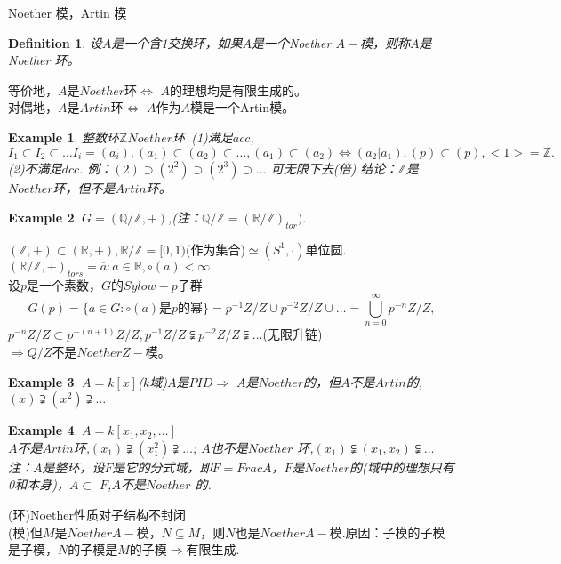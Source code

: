 \documentclass[UTF8]{article}
\newtheorem{defn}{Definition}[section]
\newtheorem{exa}{Example}[section]
\begin{document}
Noether 模，Artin 模\\
\begin{defn}
	设$A$是一个含1交换环，如果$A$是一个Noether $A-$模，则称$A$是Noether 环。
\end{defn}
等价地，$A$是$Noether$环$\Leftrightarrow$ $A$的理想均是有限生成的。\\
对偶地，$A$是$Artin$环$\Leftrightarrow$ $A$作为$A$模是一个Artin模。
\begin{exa}
整数环$\mathbb{Z}Noether$环\
(1)满足$acc$,$I_1\subset I_2\subset\ldots I_i=(a_i),
(a_1)\subset(a_2)\subset\ldots,(a_1)\subset(a_2)\Leftrightarrow(a_2|a_1),(p)\subset(p),<1>=\mathbb{Z}.$\\
(2)不满足$dcc$.
例：$(2)\supset(2^2)\supset(2^3)\supset\ldots$ 可无限下去(倍)
结论：$\mathbb{Z}$是$Noether$环，但不是$Artin$环。
\end{exa}
\begin{exa}
$G=(\mathbb{Q}/\mathbb{Z},+)$,(注：$\mathbb{Q}/\mathbb{Z}=(\mathbb{R}/\mathbb{Z})_{tor}).$
\end{exa}
$(\mathbb{Z},+)\subset(\mathbb{R},+),\mathbb{R}/\mathbb{Z}=[0,1)$(作为集合)$\simeq(S^1,\cdot)$单位圆.\\
$(\mathbb{R}/\mathbb{Z},+)_{tors}={\overline{a}:a\in \mathbb{R},\circ(a)<\infty}.$\\
设$p$是一个素数，$G$的$Sylow-p$子群
$$G(p)=\{a\in G:\circ(a)\text{是}p\text{的幂}\}=p^{-1}Z/Z\cup p^{-2}Z/Z\cup\ldots
=\bigcup\limits_{n=0}^\infty{p^{-n}Z/Z},
$$
$p^{-n}Z/Z\subset p^{-(n+1)}Z/Z,
p^{-1}Z/Z\subsetneqq p^{-2}Z/Z\subsetneqq\ldots$(无限升链)\\
$\Rightarrow Q/Z$不是$Noether Z-$模。\\
\begin{exa}
$A=k[x]$($k$域)$A$是$PID\Rightarrow$ $A$是$Noether$的，但$A$不是$Artin$的,$(x)\supsetneqq(x^2)\supsetneqq\ldots$
\end{exa}
\begin{exa}

$A=k[x_1,x_2,\ldots]$\\
$A$不是$Artin$环,$(x_1)\supsetneqq(x_1^2)\supsetneqq\ldots$;
$A$也不是$Noether$ 环,$(x_1)\subsetneqq(x_1,x_2)\subsetneqq\ldots$\\
注：$A$是整环，设$F$是它的分式域，即$F=FracA$，$F$是$Noether$的(域中的理想只有0和本身)，$A\subset$ $F$,$A$不是$Noether$ 的.
\end{exa}
(环)Noether性质对子结构不封闭\\
(模)但$M$是$Noether A-$模，$N\subseteq M$，则$N$也是$Noether A-$模.原因：子模的子模是子模，$N$的子模是$M$的子模$\Rightarrow$有限生成.\\
\end{document}
